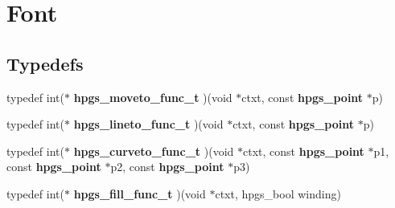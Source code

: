 \section{Font}
\label{group__font}
\subsection*{Typedefs}
\begin{DoxyCompactItemize}
\item 
typedef int($\ast$ {\bfseries hpgs\_\-moveto\_\-func\_\-t} )(void $\ast$ctxt, const {\bf hpgs\_\-point} $\ast$p)\label{group__font_gadb482453b858b6b9561c76752f3e0e46}

\item 
typedef int($\ast$ {\bfseries hpgs\_\-lineto\_\-func\_\-t} )(void $\ast$ctxt, const {\bf hpgs\_\-point} $\ast$p)\label{group__font_gaaa432603ef5a4185c0e7d23e280a45b8}

\item 
typedef int($\ast$ {\bfseries hpgs\_\-curveto\_\-func\_\-t} )(void $\ast$ctxt, const {\bf hpgs\_\-point} $\ast$p1, const {\bf hpgs\_\-point} $\ast$p2, const {\bf hpgs\_\-point} $\ast$p3)\label{group__font_ga0b886c68898c98c2aaf7536f97d7bcc5}

\item 
typedef int($\ast$ {\bfseries hpgs\_\-fill\_\-func\_\-t} )(void $\ast$ctxt, hpgs\_\-bool winding)\label{group__font_gabad7cbae9e3d41a823f63520ab61c167}

\end{DoxyCompactItemize}

